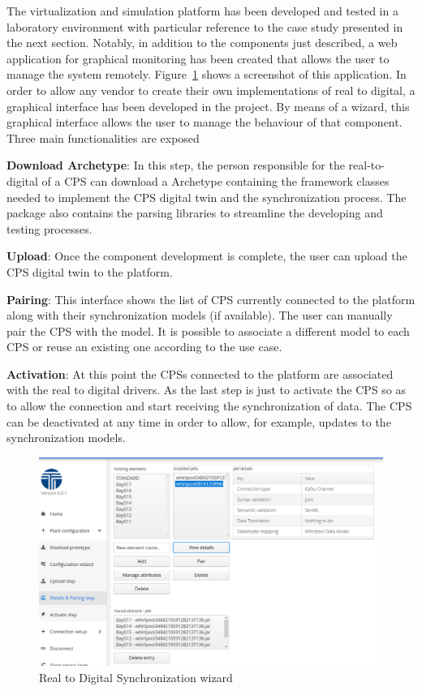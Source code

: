 The virtualization and simulation platform has been developed and tested in a laboratory environment with particular reference to the case study presented in the next section. Notably, in addition to the components just described, a web application for graphical monitoring has been created that allows the user to manage the system remotely. Figure~\ref{fig:wizard} shows a screenshot of this application. 
In order to allow any vendor to create their own implementations of real to digital, a graphical interface has been developed in the project. 
By means of a wizard, this graphical interface allows the user to manage the behaviour of that component. 
Three main functionalities are exposed
\begin{description}


\item \textbf{Download Archetype}: In this step, the person responsible for the real-to-digital of a CPS can download a Archetype containing the framework classes needed to implement the CPS digital twin and the synchronization process. The package also contains the parsing libraries to streamline the developing and testing processes.
\item \textbf{Upload}: Once the component development is complete, the user can upload the CPS digital twin to the platform.
\item \textbf{Pairing}: This interface shows the list of CPS currently connected to the platform along with their synchronization models (if available). The user can manually pair the CPS with the model. It is possible to associate a different model to each CPS or reuse an existing one according to the use case.
\item \textbf{Activation}: At this point the CPSs connected to the platform are associated with the real to digital drivers. As the last step is just to activate the CPS so as to allow the connection and start receiving the synchronization of data. The CPS can be deactivated at any time in order to allow, for example, updates to the synchronization models.
\end{description}

\begin{figure}
  \includegraphics[width=\linewidth]{images/wizard.PNG}
  \caption{Real to Digital Synchronization wizard}
  \label{fig:wizard}
\end{figure}





